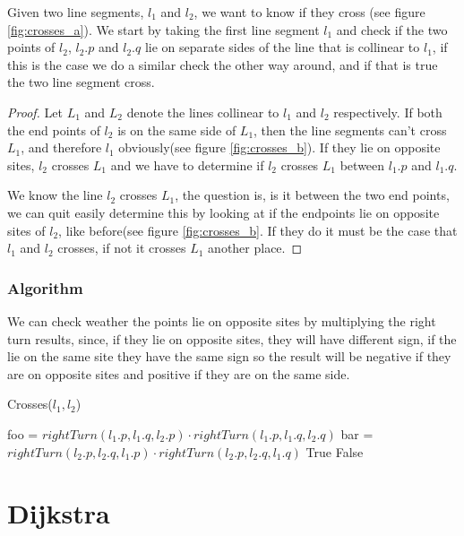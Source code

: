 \begin{Lemma}
	Given two line segments, $l_1$ and $l_2$, we want to know if they cross (see
	figure \ref{fig:crosses_a}). We start by taking the first line segment
	$l_1$ and check if the two points of $l_2$, $l_2.p$ and $l_2.q$ lie on
	separate sides of the line that is collinear to $l_1$, if this is the case
	we do a similar check the other way around, and if that is true the two line
	segment cross.
\end{Lemma}
\begin{proof}
Let $L_1$ and $L_2$ denote the lines collinear to $l_1$ and $l_2$ respectively.
	If both the end points of $l_2$ is on the same side of $L_1$, then the line
	segments can't cross $L_1$, and therefore $l_1$ obviously(see figure
	\ref{fig:crosses_b}). If they lie on opposite sites, $l_2$ crosses $L_1$ and
	we have to determine if $l_2$ crosses $L_1$ between $l_1.p$ and $l_1.q$. 

We know the line $l_2$ crosses $L_1$, the question is, is it between the two
	end points, we can quit easily determine this by looking at if the endpoints
	lie on opposite sites of $l_2$, like before(see figure \ref{fig:crosses_b}.
	If they do it must be the case that $l_1$ and $l_2$ crosses, if not it
	crosses $L_1$ another place.
\end{proof}

\subsubsection{Algorithm}
We can check weather the points lie on opposite sites
by multiplying the right turn results, since, if they lie on opposite sites,
they will have different sign, if the lie on the same site they have the same
sign so the result will be negative if they are on opposite sites and positive
if they are on the same side.
\begin{algorithm}[H]
	\caption{Crosses($l_1,l_2$)}
	\begin{algorithmic}[1] 
		\State foo = $rightTurn(l_1.p,l_1.q,l_2.p)\cdot
		rightTurn(l_1.p,l_1.q,l_2.q)$
		\State bar = $rightTurn(l_2.p,l_2.q,l_1.p)\cdot
		rightTurn(l_2.p,l_2.q,l_1.q)$
		\State \Return True
		\Else
		\State \Return False
		\EndIf
	\end{algorithmic}
\end{algorithm}

\section{Dijkstra}

